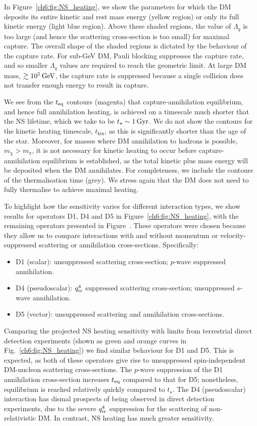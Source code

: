 In Figure~\ref{ch6:fig:NS_heating}, we show the parameters for which the DM deposits its entire kinetic and rest mass energy (yellow region) or only its full kinetic energy (light blue region).  Above these shaded regions, the value of $\Lambda_q$ is too large (and hence the scattering cross-section is too small) for maximal capture.
The overall shape of the shaded regions is dictated by the behaviour of the capture rate. For sub-GeV DM, Pauli blocking suppresses the capture rate, and so smaller $\Lambda_q$ values are required to reach the geometric limit. At large DM mass, $\gtrsim 10^5{\rm \,GeV}$, the capture rate is suppressed because a single collision does not transfer enough energy to result in capture.


We see from the $t_{\rm eq}$ contours (magenta) that capture-annihilation equilibrium, and hence full annihilation heating, is achieved on a timescale much shorter that the NS lifetime, which we take to be $t_\star\sim 1{\rm \,Gyr}$. 
We do not show the contours for the kinetic heating timescale, $t_\mathrm{kin}$, as this is significantly shorter than the age of the star.  Moreover, for masses where DM annihilation to hadrons is possible, $m_\chi>m_\pi$, it is not necessary for kinetic heating to occur before capture-annihilation equilibrium is established, as the total kinetic plus mass energy will be deposited when the DM annihilates. 
For completeness, we include the contours of the thermalisation time (grey). We stress again that the DM does not need to fully thermalise to achieve maximal heating.


To highlight how the sensitivity varies for different interaction types, we show results for operators D1, D4 and D5 in Figure~\ref{ch6:fig:NS_heating}, with the remaining operators presented in Figure~. These operators were chosen because they allow us to compare interactions with and without momentum or velocity-suppressed scattering or annihilation cross-sections. Specifically: 
\begin{itemize}
\item D1 (scalar): unsuppressed scattering cross-section; $p$-wave suppressed annihilation.
\item D4 (pseudoscalar): $q_{\rm tr}^4$ suppressed scattering cross-section; unsuppressed $s$-wave annihilation.
\item D5 (vector): unsuppressed scattering and annihilation cross-sections.
\end{itemize}

Comparing the projected NS heating sensitivity with limits from terrestrial direct detection experiments (shown as green and orange curves in Fig.~\ref{ch6:fig:NS_heating}) we find similar behaviour for D1 and D5. This is expected, as both of these operators give rise to unsuppressed spin-independent DM-nucleon scattering cross-sections. The $p$-wave suppression of the D1 annihilation cross-section increases $t_{\rm eq}$ compared to that for D5; nonetheless, equilibrium is reached relatively quickly compared to $t_\star$.  The D4 (pseudoscalar) interaction has dismal prospects of being observed in direct detection experiments, due to the severe  $q_{\rm tr}^4$ suppression for the scattering of non-relativistic DM. In contrast, NS heating has much greater sensitivity.

